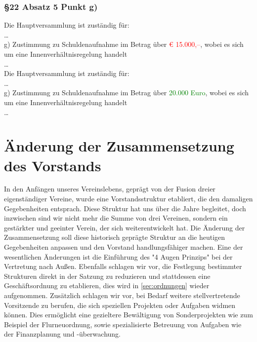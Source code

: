 \documentclass[10pt,a4paper,parskip=half]{scrartcl}
\newcommand{\new}[1]{\textcolor{Green}{#1}}
\newcommand{\old}[1]{\textcolor{Red}{#1}}
\newcommand{\change}[1]{
  \begin{adjustwidth}{20pt}{20pt}
    #1
  \end{adjustwidth}
}
\newcommand{\compare}[3]{\change{\subsubsection*{#1}\begin{multicols}{2}#2\columnbreak\\#3\end{multicols}}}
\begin{document}
\compare{§22 Absatz 5 Punkt g)}
{Die Hauptversammlung ist zuständig für: \\ \dots\\g) Zustimmung zu Schuldenaufnahme im Betrag über \old{€ 15.000,--}, wobei es sich um eine Innenverhältnisregelung handelt\\\dots}
{Die Hauptversammlung ist zuständig für: \\ \dots\\g) Zustimmung zu Schuldenaufnahme im Betrag über \new{20.000 Euro}, wobei es sich um eine Innenverhältnisregelung handelt\\\dots}

\clearpage
\section{Änderung der Zusammensetzung des Vorstands}
\label{sec:vorstand}
In den Anfängen unseres Vereinslebens, geprägt von der Fusion dreier eigenständiger Vereine, wurde eine Vorstandsstruktur etabliert, die den damaligen Gegebenheiten entsprach. Diese Struktur hat uns über die Jahre begleitet, doch inzwischen sind wir nicht mehr die Summe von drei Vereinen, sondern ein gestärkter und geeinter Verein, der sich weiterentwickelt hat.
Die Änderung der Zusammensetzung soll diese historisch geprägte Struktur an die heutigen Gegebenheiten anpassen und den Vorstand handlungsfähiger machen. Eine der wesentlichen Änderungen ist die Einführung des "4 Augen Prinzips" bei der Vertretung nach Außen. Ebenfalls schlagen wir vor, die Festlegung bestimmter Strukturen direkt in der Satzung zu reduzieren und stattdessen eine Geschäftsordnung zu etablieren, dies wird in \autoref{sec:ordnungen} wieder aufgenommen. Zusätzlich schlagen wir vor, bei Bedarf weitere stellvertretende Vorsitzende zu berufen, die sich speziellen Projekten oder Aufgaben widmen können. Dies ermöglicht eine gezieltere Bewältigung von Sonderprojekten wie zum Beispiel der Flurneuordnung, sowie spezialisierte Betreuung von Aufgaben wie der Finanzplanung und -überwachung.
\end{document}
